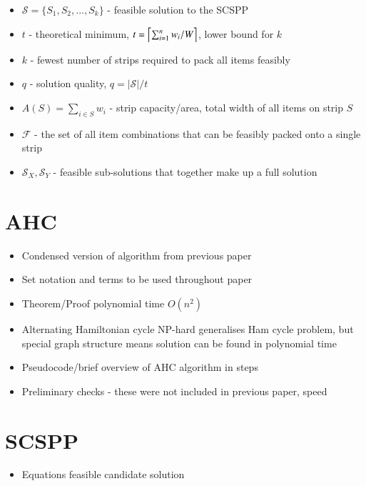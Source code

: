 \documentclass{elsarticle}
\begin{document}
\begin{itemize}
	\item $\mathcal{S} = \{S_1, S_2,...,S_k\}$ - feasible solution to the SCSPP
	\item $t$ - theoretical minimum, $t = \ceil*{\sum_{i=1}^{n}w_i / W}$, lower bound for $k$
	\item $k$ - fewest number of strips required to pack all items feasibly
	\item $q$ - solution quality, $q = |\mathcal{S}| / t$
	\item $A(S) = \sum_{i \in S}w_i$ - strip capacity/area, total width of all items on strip $S$
	\item $\mathcal{F}$ - the set of all item combinations that can be feasibly packed onto a single strip
	\item $\mathcal{S}_X, \mathcal{S}_Y$ - feasible sub-solutions that together make up a full solution
\end{itemize}

\section{AHC}
\begin{itemize}
	\item Condensed version of algorithm from previous paper
	\item Set notation and terms to be used throughout paper
	\item Theorem/Proof polynomial time $O(n^2)$
	\item Alternating Hamiltonian cycle NP-hard generalises Ham cycle problem, but special graph structure means solution can be found in polynomial time
	\item Pseudocode/brief overview of AHC algorithm in steps
	\item Preliminary checks - these were not included in previous paper, speed
\end{itemize}

\section{SCSPP}
\begin{itemize}
	\item Equations feasible candidate solution
\end{itemize}
\end{document}
